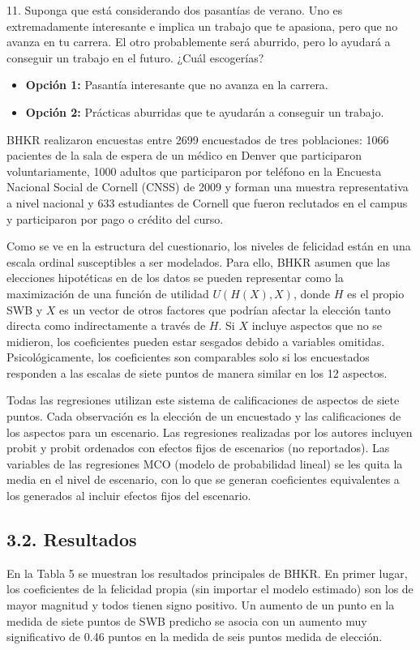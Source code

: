 \documentclass[12pt,spanish]{article}
\begin{document}
11. Suponga que está considerando dos pasantías de verano. Uno es extremadamente interesante e implica un trabajo que te apasiona, pero que no avanza en tu carrera. El otro probablemente será aburrido, pero lo ayudará a conseguir un trabajo en el futuro. ¿Cuál escogerías?
\begin{itemize}
    \item \textbf{Opción 1:} Pasantía interesante que no avanza en la carrera.
    \item \textbf{Opción 2:} Prácticas aburridas que te ayudarán a conseguir un trabajo.
\end{itemize}

BHKR realizaron encuestas entre 2699 encuestados de tres poblaciones: 1066 pacientes de la sala de espera de un médico en Denver que participaron voluntariamente, 1000 adultos que participaron por teléfono en la Encuesta Nacional Social de Cornell (CNSS) de 2009 y forman una muestra representativa a nivel nacional y 633 estudiantes de Cornell que fueron reclutados en el campus y participaron por pago o crédito del curso.

Como se ve en la estructura del cuestionario, los niveles de felicidad están en una escala ordinal susceptibles a ser modelados. Para ello, BHKR asumen que las elecciones hipotéticas en de los datos se pueden representar como la maximización de una función de utilidad $U(H(X),X)$, donde $H$ es el propio SWB y $X$ es un vector de otros factores que podrían afectar la elección tanto directa como indirectamente a través de $H$. Si $X$ incluye aspectos que no se midieron, los coeficientes pueden estar sesgados debido a variables omitidas. Psicológicamente, los coeficientes son comparables solo si los encuestados responden a las escalas de siete puntos de manera similar en los 12 aspectos.

Todas las regresiones utilizan este sistema de calificaciones de aspectos de siete puntos. Cada observación es la elección de un encuestado y las calificaciones de los aspectos para un escenario. Las regresiones realizadas por los autores incluyen probit y probit ordenados con efectos fijos de escenarios (no reportados). Las variables de las regresiones MCO (modelo de probabilidad lineal) se les quita la media en el nivel de escenario, con lo que se generan coeficientes equivalentes a los generados al incluir efectos fijos del escenario. 



\subsection*{3.2. Resultados}
En la Tabla 5 se muestran los resultados principales de BHKR. En primer lugar, los coeficientes de la felicidad propia (sin importar el modelo estimado) son los de mayor magnitud y todos tienen signo positivo. Un aumento de un punto en la medida de siete puntos de SWB predicho se asocia con un aumento muy significativo de 0.46 puntos en la medida de seis puntos medida de elección.
\end{document}
